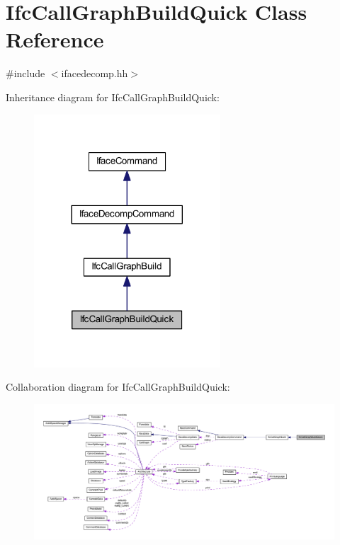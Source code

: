\hypertarget{class_ifc_call_graph_build_quick}{}\section{Ifc\+Call\+Graph\+Build\+Quick Class Reference}
\label{class_ifc_call_graph_build_quick}


{\ttfamily \#include $<$ifacedecomp.\+hh$>$}



Inheritance diagram for Ifc\+Call\+Graph\+Build\+Quick\+:
\nopagebreak
\begin{figure}[H]
\begin{center}
\leavevmode
\includegraphics[width=197pt]{class_ifc_call_graph_build_quick__inherit__graph}
\end{center}
\end{figure}


Collaboration diagram for Ifc\+Call\+Graph\+Build\+Quick\+:
\nopagebreak
\begin{figure}[H]
\begin{center}
\leavevmode
\includegraphics[width=350pt]{class_ifc_call_graph_build_quick__coll__graph}
\end{center}
\end{figure}
